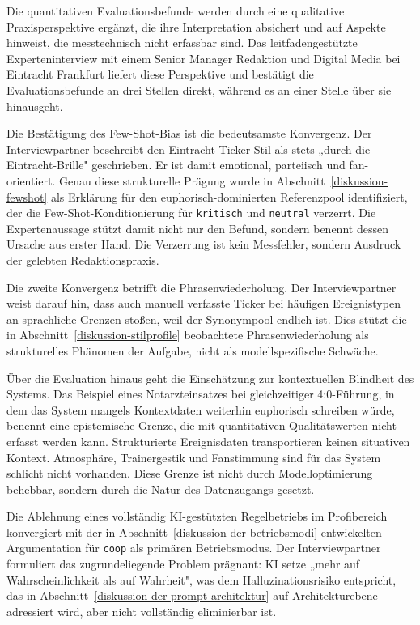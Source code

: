 Die quantitativen Evaluationsbefunde werden durch eine qualitative Praxisperspektive ergänzt, die ihre Interpretation absichert und auf Aspekte hinweist, die messtechnisch nicht erfassbar sind. Das leitfadengestützte Experteninterview mit einem Senior Manager Redaktion und Digital Media bei Eintracht Frankfurt liefert diese Perspektive und bestätigt die Evaluationsbefunde an drei Stellen direkt, während es an einer Stelle über sie hinausgeht.

Die Bestätigung des Few-Shot-Bias ist die bedeutsamste Konvergenz. Der Interviewpartner beschreibt den Eintracht-Ticker-Stil als stets „durch die Eintracht-Brille" geschrieben. Er ist damit emotional, parteiisch und fan-orientiert. Genau diese strukturelle Prägung wurde in Abschnitt~\ref{diskussion-fewshot} als Erklärung für den euphorisch-dominierten Referenzpool identifiziert, der die Few-Shot-Konditionierung für \texttt{kritisch} und \texttt{neutral} verzerrt. Die Expertenaussage stützt damit nicht nur den Befund, sondern benennt dessen Ursache aus erster Hand. Die Verzerrung ist kein Messfehler, sondern Ausdruck der gelebten Redaktionspraxis.

Die zweite Konvergenz betrifft die Phrasenwiederholung. Der Interviewpartner weist darauf hin, dass auch manuell verfasste Ticker bei häufigen Ereignistypen an sprachliche Grenzen stoßen, weil der Synonympool endlich ist. Dies stützt die in Abschnitt~\ref{diskussion-stilprofile} beobachtete Phrasenwiederholung als strukturelles Phänomen der Aufgabe, nicht als modellspezifische Schwäche.

Über die Evaluation hinaus geht die Einschätzung zur kontextuellen Blindheit des Systems. Das Beispiel eines Notarzteinsatzes bei gleichzeitiger 4:0-Führung, in dem das System mangels Kontextdaten weiterhin euphorisch schreiben würde, benennt eine epistemische Grenze, die mit quantitativen Qualitätswerten nicht erfasst werden kann. Strukturierte Ereignisdaten transportieren keinen situativen Kontext. Atmosphäre, Trainergestik und Fanstimmung sind für das System schlicht nicht vorhanden. Diese Grenze ist nicht durch Modelloptimierung behebbar, sondern durch die Natur des Datenzugangs gesetzt.

Die Ablehnung eines vollständig KI-gestützten Regelbetriebs im Profibereich konvergiert mit der in Abschnitt~\ref{diskussion-der-betriebsmodi} entwickelten Argumentation für \texttt{coop} als primären Betriebsmodus. Der Interviewpartner formuliert das zugrundeliegende Problem prägnant: KI setze „mehr auf Wahrscheinlichkeit als auf Wahrheit", was dem Halluzinationsrisiko entspricht, das in Abschnitt~\ref{diskussion-der-prompt-architektur} auf Architekturebene adressiert wird, aber nicht vollständig eliminierbar ist.


